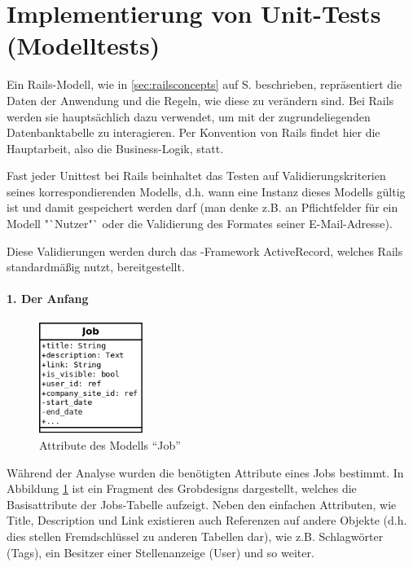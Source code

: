 \section{Implementierung von Unit-Tests (Modelltests)}
\label{sec:awunit}

Ein Rails-Modell, wie in \ref{sec:railsconcepts} auf S. \pageref{sec:railsconcepts} beschrieben, repräsentiert die Daten der Anwendung und die Regeln, wie diese zu verändern sind. Bei Rails werden sie hauptsächlich dazu verwendet, um mit der zugrundeliegenden Datenbanktabelle zu interagieren. Per Konvention von Rails findet hier die Hauptarbeit, also die Business-Logik, statt.

Fast jeder Unittest bei Rails beinhaltet das Testen auf Validierungskriterien seines korrespondierenden Modells, d.h. wann eine Instanz dieses Modells gültig ist und damit gespeichert werden darf (man denke z.B. an Pflichtfelder für ein Modell "`Nutzer"` oder die Validierung des Formates seiner E-Mail-Adresse).

Diese Validierungen werden durch das -Framework ActiveRecord, welches Rails standardmäßig nutzt, bereitgestellt.

\paragraph{1. Der Anfang}
\begin{figure}[htbp]
 \centering

 \includegraphics[width=0.3\textwidth]{./diagrams/job-erm.png}
 \caption{Attribute des Modells "`Job"'}
  \label{fig:job-erm}
\end{figure}

Während der Analyse wurden die benötigten Attribute eines Jobs bestimmt. In Abbildung \ref{fig:job-erm} ist ein Fragment des Grobdesigns dargestellt, welches die Basisattribute der Jobs-Tabelle aufzeigt. Neben den einfachen Attributen, wie Title, Description und Link existieren auch Referenzen auf andere Objekte (d.h. dies stellen Fremdschlüssel zu anderen Tabellen dar), wie z.B. Schlagwörter (Tags), ein Besitzer einer Stellenanzeige (User) und so weiter.

